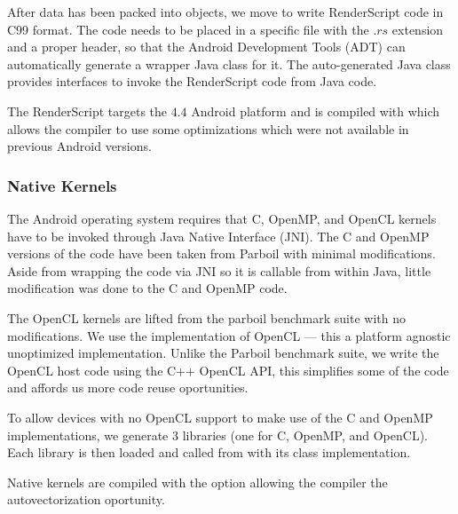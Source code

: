 After data has been packed into  objects, we move to write
RenderScript code in C99 format. The code needs to be placed in a specific file
with the $.rs$ extension and a proper header, so that the Android Development
Tools (ADT) can automatically generate a wrapper Java class for it. The
auto-generated Java class provides interfaces to invoke the RenderScript code
from Java code.

The RenderScript targets the $4.4$ Android platform and 
	is compiled with  which
	allows the compiler to use some optimizations which were not available in
	previous Android versions.

\subsubsection{Native Kernels}

The Android operating system requires that C, OpenMP, and OpenCL kernels have to
be invoked through Java Native Interface (JNI).  The C and OpenMP versions of
the code have been taken from Parboil with minimal modifications.  Aside from
wrapping the code via JNI so it is callable from within Java, little
modification was done to the C and OpenMP code.

The OpenCL kernels are lifted from the parboil benchmark suite with no
modifications.  We use the  implementation of OpenCL --- this a
platform agnostic unoptimized implementation.  Unlike the Parboil benchmark
suite, we write the OpenCL host code using the C++ OpenCL API, this simplifies
some of the code and affords us more code reuse oportunities.

To allow devices with no OpenCL support to make use of the C and OpenMP
implementations, we generate 3 libraries (one for C, OpenMP, and OpenCL).  Each
library is then loaded and called from with its class implementation.

Native kernels are compiled with the 
 option allowing the compiler the autovectorization oportunity.
